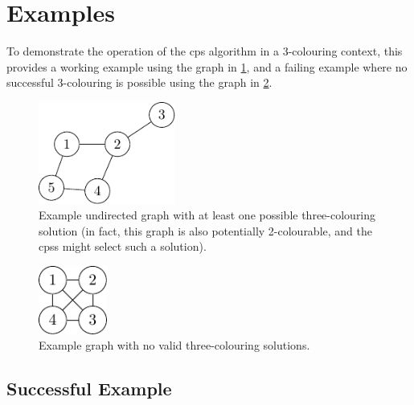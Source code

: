\section{\label{sec:gcol:examples}Examples}

To demonstrate the operation of the \gls{cps} algorithm in a 3-colouring context, this  provides a working example using the graph in \cref{fig:gcol:examplegraph}, and a failing example where no successful 3-colouring is possible using the graph in \cref{fig:gcol:examplegraphnosol}.

\begin{figure}
    \centering
    \includegraphics[width=0.4\textwidth]{chapters/gcol/figs/examplegraph1-figure2.pdf}
    \caption[Example graph with at least one possible three-colouring solution]{Example undirected graph with at least one possible three-colouring solution (in fact, this graph is also potentially 2-colourable, and the \glspl{cps} might select such a solution).}
    \label{fig:gcol:examplegraph}
\end{figure}

\begin{figure}
    \centering
    \includegraphics[width=0.2\textwidth]{chapters/gcol/figs/examplegraph1-figure3.pdf}
    \caption{Example graph with no valid three-colouring solutions.}
    \label{fig:gcol:examplegraphnosol}
\end{figure}

\subsection{Successful Example}


